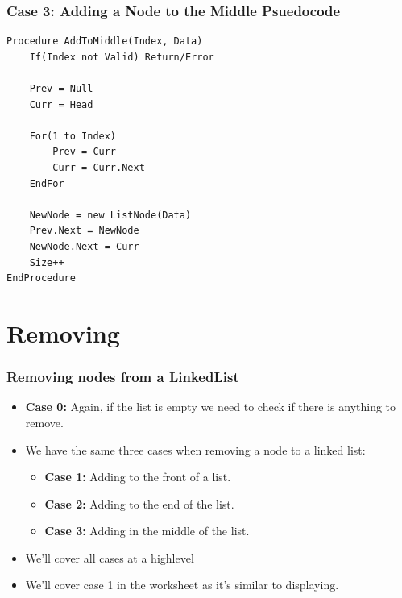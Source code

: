 \documentclass{beamer}
\begin{document}
\begin{frame}[fragile]
    \frametitle{Case 3: Adding a Node to the Middle Psuedocode}
    \vfill
    \centering
    \begin{lstlisting}[frame=trBL]
Procedure AddToMiddle(Index, Data)
    If(Index not Valid) Return/Error

    Prev = Null
    Curr = Head
    
    For(1 to Index)
        Prev = Curr
        Curr = Curr.Next
    EndFor
    
    NewNode = new ListNode(Data)
    Prev.Next = NewNode
    NewNode.Next = Curr
    Size++
EndProcedure
    \end{lstlisting}
    \vfill
\end{frame}



\section{Removing}

\begin{frame}
    \frametitle{Removing nodes from a LinkedList}
    \vfill
    \begin{itemize}
        \item \textbf{Case 0:} Again, if the list is empty we need to check if there is anything to remove.
        \item We have the same three cases when removing a node to a linked list:
            \begin{itemize}
                \item \textbf{Case 1:} Adding to the front of a list.
                \item \textbf{Case 2:} Adding to the end of the list.
                \item \textbf{Case 3:} Adding in the middle of the list.
            \end{itemize}
        \item We'll cover all cases at a highlevel
        \item We'll cover case 1 in the worksheet as it's similar to displaying.
    \end{itemize}
    \vfill
\end{frame}
\end{document}
